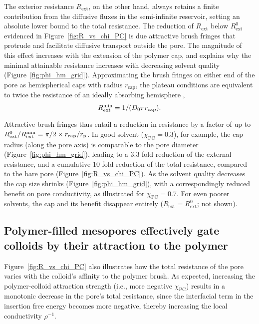 \documentclass[12pt, a4paper]{article}
\begin{document}
The exterior resistance $R_{\text{ext}}$, on the other hand, always retains a finite contribution from the diffusive fluxes in the semi-infinite reservoir, setting an absolute lower bound to the total resistance.
The reduction of $R_{\text{ext}}$ below $R^0_\text{ext}$ evidenced in Figure~\ref{fig:R_vs_chi_PC} is due attractive brush fringes that protrude and facilitate diffusive transport outside the pore.
The magnitude of this effect increases with the extension of the polymer cap, and explains why the minimal attainable resistance increases with decreasing solvent quality (Figure~\ref{fig:phi_hm_grid}).
Approximating the brush fringes on either end of the pore as hemispherical caps with radius $r_\text{cap}$, the plateau conditions are equivalent to twice the resistance of an ideally absorbing hemisphere \cite{Crank1980},
\begin{equation}
    R_\text{ext}^\text{\text{min}} = 1 / (D_0 \pi r_\text{cap}).
    \label{eq:R_ext_min}
\end{equation}

Attractive brush fringes thus entail a reduction in resistance by a factor of up to $R_\text{ext}^0 / R_\text{ext}^\text{\text{min}} = \pi/2 \times r_\text{cap}/r_\text{p}$.
In good solvent ($\chi_\text{PC} = 0.3$), for example, the cap radius (along the pore axis) is comparable to the pore diameter (Figure~\ref{fig:phi_hm_grid}), leading to a 3.3-fold reduction of the external resistance, and a cumulative 10-fold reduction of the total resistance, compared to the bare pore (Figure~\ref{fig:R_vs_chi_PC}).
As the solvent quality decreases the cap size shrinks (Figure~\ref{fig:phi_hm_grid}), with a correspondingly reduced benefit on pore conductivity, as illustrated for $\chi_\text{PC} = 0.7$.
For even poorer solvents, the cap and its benefit disappear entirely ($R_\text{ext} = R_\text{ext}^0$; not shown).


\subsection{Polymer-filled mesopores effectively gate colloids by their attraction to the polymer}

Figure~\ref{fig:R_vs_chi_PC} also illustrates how the total resistance of the pore varies with the colloid's affinity to the polymer brush.
As expected, increasing the polymer-colloid attraction strength (i.e., more negative $\chi_{\text{PC}}$) results in a monotonic decrease in the pore's total resistance, since the interfacial term in the insertion free energy becomes more negative, thereby increasing the local conductivity $\rho^{-1}$.
\end{document}
